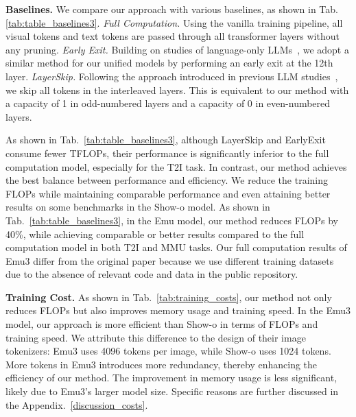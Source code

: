 
% 



\textbf{Baselines.} We compare our approach with various baselines, as shown in Tab.\ref{tab:table_baselines3}. \textit{Full Computation.} Using the vanilla training pipeline, all visual tokens and text tokens are passed through all transformer layers without any pruning. \textit{Early Exit.} Building on studies of language-only LLMs~\cite{earlyexit1}, we adopt a similar method for our unified models by performing an early exit at the 12th layer. \textit{LayerSkip.} Following the approach introduced in previous LLM studies~\cite{skiplayer}, we skip all tokens in the interleaved layers. This is equivalent to our method with a capacity of 1 in odd-numbered layers and a capacity of 0 in even-numbered layers. 

As shown in Tab.~\ref{tab:table_baselines3}, although LayerSkip and EarlyExit consume fewer TFLOPs, their performance is significantly inferior to the full computation model, especially for the T2I task. In contrast, our method achieves the best balance between performance and efficiency. We reduce the training FLOPs while maintaining comparable performance and even attaining better results on some benchmarks in the Show-o model. As shown in Tab.~\ref{tab:table_baselines3}, in the Emu model, our method reduces FLOPs by 40\%, while achieving comparable or better results compared to the full computation model in both T2I and MMU tasks. Our full computation results of Emu3 differ from the original paper because we use different training datasets due to the absence of relevant code and data in the public repository.






\textbf{Training Cost.} As shown in Tab.~\ref{tab:training_costs}, our method not only reduces FLOPs but also improves memory usage and training speed. In the Emu3 model, our approach is more efficient than Show-o in terms of FLOPs and training speed. We attribute this difference to the design of their image tokenizers: Emu3 uses 4096 tokens per image, while Show-o uses 1024 tokens. More tokens in Emu3 introduces more redundancy, thereby enhancing the efficiency of our method. The improvement in memory usage is less significant, likely due to Emu3's larger model size. Specific reasons are further discussed in the Appendix.~\ref{discussion_costs}.

